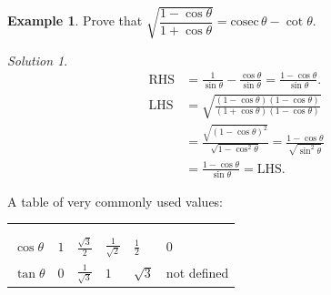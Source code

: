 \documentclass[
  english,
  12pt,
  oneside]{book}
\newcounter{none} %
\theoremstyle{definition}
\theoremstyle{definition}
\newtheorem{example}{Example}[chapter]
\theoremstyle{definition}
\theoremstyle{definition}
\theoremstyle{remark}
\newtheorem*{solution}{Solution}
\begin{document}
\begin{example}
Prove that \(\sqrt{\dfrac{1-\cos\theta}{1+\cos\theta}} = \mathrm{cosec}\,\theta-\cot\theta\).
\end{example}

\begin{solution}
\begin{align*}
\mathrm{RHS} &= \frac{1}{\sin\theta}-\frac{\cos\theta}{\sin\theta}= \frac{1-\cos\theta}{\sin\theta}.\\
\mathrm{LHS} &= \sqrt{\frac{(1-\cos\theta)(1-\cos\theta)}{(1+\cos\theta)(1-\cos\theta)}} \\
&= \frac{\sqrt{(1-\cos\theta)^2}}{\sqrt{1-\cos^2\theta}} = \frac{1-\cos\theta}{\sqrt{\sin^2\theta}}\\
&= \frac{1-\cos\theta}{\sin\theta} = \mathrm{LHS}.
\end{align*}
\end{solution}

A table of very commonly used values:

{\def\LTcaptype{none} %
\begin{longtable}[]{@{}
  >{\raggedright\arraybackslash}p{}
  >{\centering\arraybackslash}p{}
  >{\centering\arraybackslash}p{}
  >{\centering\arraybackslash}p{}
  >{\centering\arraybackslash}p{}
  >{\centering\arraybackslash}p{}@{}}
\toprule\noalign{}
\endhead
\bottomrule\noalign{}
\endlastfoot
\multirow{2}{=}{\(\theta\)
:---------------
\(\sin\theta\)} & \multirow{2}{=}{\centering\arraybackslash \(0\)
:-----:
\(0\)} & \multirow{2}{=}{\centering\arraybackslash \(\frac{\pi}6\)
:------------------:
\(\frac12\)} & \multirow{2}{=}{\centering\arraybackslash \(\frac{\pi}4\)
:------------------:
\(\frac1{\sqrt2}\)} & \multirow{2}{=}{\centering\arraybackslash \(\frac{\pi}3\)
:------------------:
\(\frac{\sqrt3}2\)} & \multirow{2}{=}{\centering\arraybackslash \(\frac{\pi}2\)
:---------------:
\(1\)} \\
 \\
\(\cos\theta\) & \(1\) & \(\frac{\sqrt3}2\) & \(\frac1{\sqrt2}\) & \(\frac12\) & \(0\) \\
\(\tan\theta\) & \(0\) & \(\frac1{\sqrt3}\) & \(1\) & \(\sqrt3\) & not defined \\
\end{longtable}
}
\end{document}
